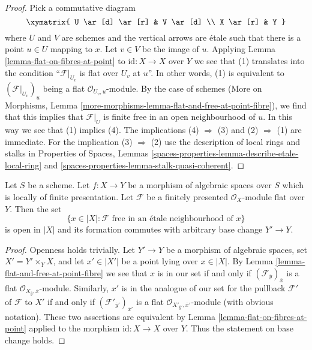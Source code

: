 \begin{proof}
Pick a commutative diagram
$$
\xymatrix{
U \ar[d] \ar[r] & V \ar[d] \\
X \ar[r] & Y
}
$$
where $U$ and $V$ are schemes and the vertical arrows are \'etale
such that there is a point $u \in U$ mapping to $x$. Let $v \in V$
be the image of $u$. Applying Lemma \ref{lemma-flat-on-fibres-at-point}
to $\text{id} : X \to X$ over $Y$ we see that (1) translates into
the condition ``$\mathcal{F}|_{U_v}$ is flat over $U_v$ at $u$''.
In other words, (1) is equivalent to $(\mathcal{F}|_{U_v})_u$
being a flat $\mathcal{O}_{U_v, u}$-module.
By the case of schemes (More on Morphisms, Lemma
\ref{more-morphisms-lemma-flat-and-free-at-point-fibre}),
we find that this implies that
$\mathcal{F}|_U$ is finite free in an open neighbourhood
of $u$. In this way we see that (1) implies (4).
The implications (4) $\Rightarrow$ (3) and
(2) $\Rightarrow$ (1) are immediate.
For the implication (3) $\Rightarrow$ (2) use
the description of local rings and stalks in
Properties of Spaces, Lemmas
\ref{spaces-properties-lemma-describe-etale-local-ring} and
\ref{spaces-properties-lemma-stalk-quasi-coherent}.
\end{proof}

\begin{lemma}
\label{lemma-finite-free-open}
Let $S$ be a scheme. Let $f : X \to Y$ be a morphism of algebraic spaces
over $S$ which is locally of finite presentation.
Let $\mathcal{F}$ be a finitely presented $\mathcal{O}_X$-module
flat over $Y$. Then the set
$$
\{x \in |X| : \mathcal{F}\text{ free in an \'etale neighbourhood of }x\}
$$
is open in $|X|$ and its formation commutes with arbitrary base change
$Y' \to Y$.
\end{lemma}

\begin{proof}
Openness holds trivially. Let $Y' \to Y$ be a morphism of algebraic spaces,
set $X' = Y' \times_Y X$, 
and let $x' \in |X'|$ be a point lying over $x \in |X|$.
By Lemma \ref{lemma-flat-and-free-at-point-fibre}
we see that $x$ is in our set if and only if
$(\mathcal{F}_{\overline{y}})_{\overline{x}}$ is a flat
$\mathcal{O}_{X_{\overline{y}}, \overline{x}}$-module.
Similarly, $x'$ is in the analogue of our set for the pullback
$\mathcal{F}'$ of $\mathcal{F}$ to $X'$ if and only if
$(\mathcal{F}'_{\overline{y}'})_{\overline{x}'}$ is a flat
$\mathcal{O}_{X'_{\overline{y}'}, \overline{x}'}$-module
(with obvious notation). These two assertions are equivalent
by Lemma \ref{lemma-flat-on-fibres-at-point} applied to
the morphism $\text{id} : X \to X$ over $Y$.
Thus the statement on base change holds.
\end{proof}








